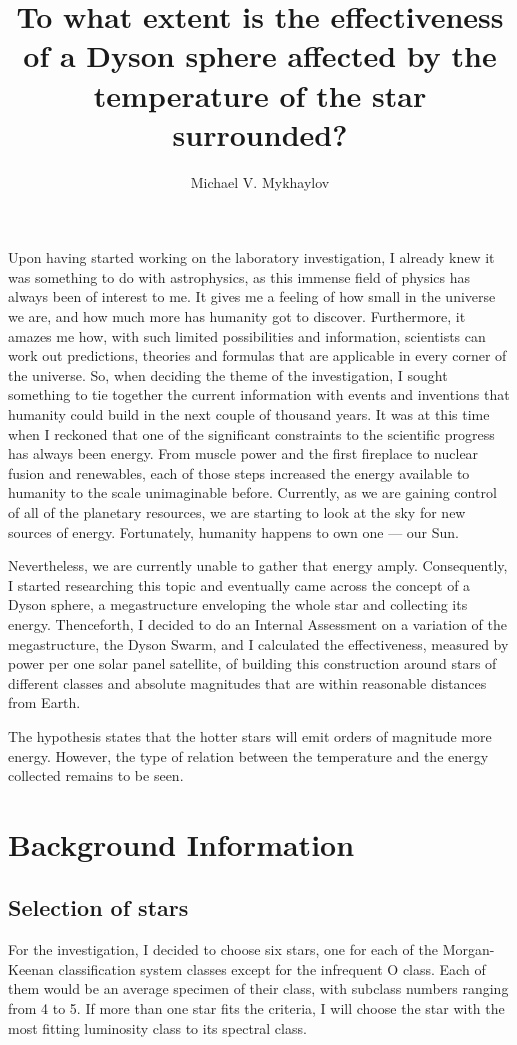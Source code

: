 \documentclass[stu, 11pt, a4paper, floatsintext, noextraspace]{apa7}
\title{To what extent is the effectiveness of a Dyson sphere affected by the temperature of the star surrounded?}
\author{Michael V. Mykhaylov}
\begin{document}
	\maketitle
	Upon having started working on the laboratory investigation, I already knew it was something to do with astrophysics, as this immense field of physics has always been of interest to me. It gives me a feeling of how small in the universe we are, and how much more has humanity got to discover. Furthermore, it amazes me how, with such limited possibilities and information, scientists can work out predictions, theories and formulas that are applicable in every corner of the universe. So, when deciding the theme of the investigation, I sought something to tie together the current information with events and inventions that humanity could build in the next couple of thousand years. It was at this time when I reckoned that one of the significant constraints to the scientific progress has always been energy. From muscle power and the first fireplace to nuclear fusion and renewables, each of those steps increased the energy available to humanity to the scale unimaginable before. Currently, as we are gaining control of all of the planetary resources, we are starting to look at the sky for new sources of energy. Fortunately, humanity happens to own one — our Sun. 
	
	Nevertheless, we are currently unable to gather that energy amply. Consequently, I started researching this topic and eventually came across the concept of a Dyson sphere, a megastructure enveloping the whole star and collecting its energy. Thenceforth, I decided to do an Internal Assessment on a variation of the megastructure, the Dyson Swarm, and I calculated the effectiveness, measured by power per one solar panel satellite, of building this construction around stars of different classes and absolute magnitudes that are within reasonable distances from Earth.

	The hypothesis states that the hotter stars will emit orders of magnitude more energy. However, the type of relation between the temperature and the energy collected remains to be seen.
	\section{Background Information}
	\subsection{Selection of stars}
	For the investigation, I decided to choose six stars, one for each of the Morgan-Keenan classification system classes except for the infrequent O class. Each of them would be an average specimen of their class, with subclass numbers ranging from 4 to 5. If more than one star fits the criteria, I will choose the star with the most fitting luminosity class to its spectral class.
\end{document}
